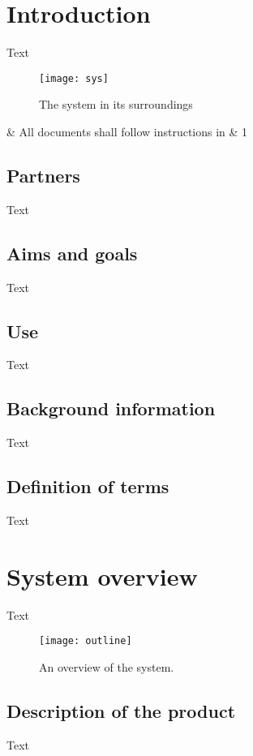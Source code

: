 \documentclass[10pt,oneside,english]{lips}
\begin{document}
\cleardoublepage
{}\cfoot{\thepage}

\section{Introduction}
\label{sec:inledning}

Text
\begin{figure}[htbp]
  \centering
  \texttt{[image: sys]}
  \caption{The system in its surroundings}
  \label{fig:sys}
\end{figure}

\begin{requirements}
  \requirementno & All documents shall follow instructions in \citep{spraknamnd:2000} & 1\\
\end{requirements}

\subsection{Partners}
Text

\subsection{Aims and goals}
Text

\subsection{Use}
Text

\subsection{Background information}
Text

\subsection{Definition of terms}
Text

\section{System overview}
Text
\begin{figure}[htbp]
  \centering
  \texttt{[image: outline]}
  \caption{An overview of the system.}
  \label{fig:oversikt}
\end{figure}

\subsection{Description of the product}
Text
\end{document}
